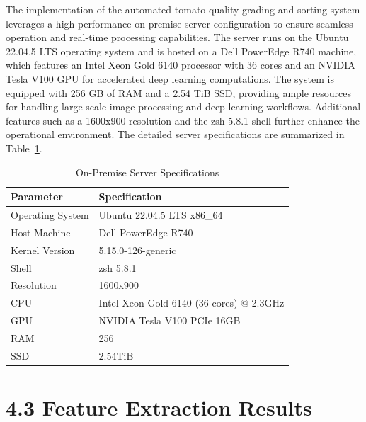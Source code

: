 \documentclass[12pt,a4paper]{report}
\begin{document}
\hspace{1cm}The implementation of the automated tomato quality grading and sorting system leverages a high-performance on-premise server configuration to ensure seamless operation and real-time processing capabilities. The server runs on the Ubuntu 22.04.5 LTS operating system and is hosted on a Dell PowerEdge R740 machine, which features an Intel Xeon Gold 6140 processor with 36 cores and an NVIDIA Tesla V100 GPU for accelerated deep learning computations. The system is equipped with 256 GB of RAM and a 2.54 TiB SSD, providing ample resources for handling large-scale image processing and deep learning workflows. Additional features such as a 1600x900 resolution and the zsh 5.8.1 shell further enhance the operational environment. The detailed server specifications are summarized in Table~\ref{tab:server_config}.
\begin{table}[h]
	\renewcommand\thetable{4.1}
	\centering
	\caption{On-Premise Server Specifications}
	\label{tab:server_config}
	\renewcommand{\arraystretch}{1.8}
	\begin{tabular}{|l|l|}
		\hline
		\textbf{Parameter}        & \textbf{Specification}            \\ \hline
		Operating System          & Ubuntu 22.04.5 LTS x86\_64        \\ \hline
		Host Machine              & Dell PowerEdge R740               \\ \hline
		Kernel Version            & 5.15.0-126-generic                \\ \hline
		Shell                     & zsh 5.8.1                         \\ \hline
		Resolution                & 1600x900                          \\ \hline
		CPU                       & Intel Xeon Gold 6140 (36 cores) @ 2.3GHz \\ \hline
		GPU                       & NVIDIA Tesla V100 PCIe 16GB       \\ \hline
		RAM                    & 256        \\ \hline
		SSD                    & 2.54TiB        \\ \hline
	\end{tabular}
\end{table}

\section*{4.3 Feature Extraction Results}
\end{document}

